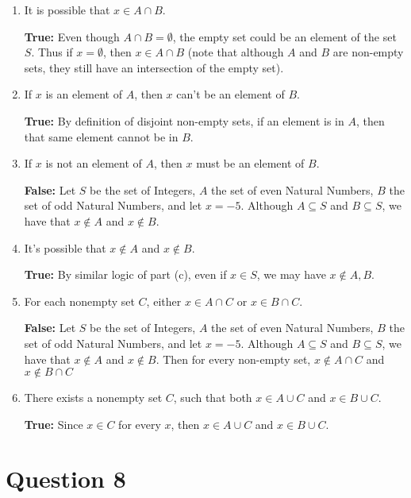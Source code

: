 \documentclass[11pt, oneside]{article}   	%
\begin{document}
\begin{enumerate}[ (a)]    

    \item It is possible that $x \in A \cap B$.
    
    \textbf{True:} Even though $A \cap B = \emptyset$, the empty set could be an element of the set $S$. Thus if $x = \emptyset$, then $x \in A \cap B$ (note that although $A$ and $B$ are non-empty sets, they still have an intersection of the empty set).
    
    \item If $x$ is an element of $A$, then $x$ can't be an element of $B$.
    
    \textbf{True:} By definition of disjoint non-empty sets, if an element is in $A$, then that same element cannot be in $B$.
    
    \item If $x$ is not an element of $A$, then $x$ must be an element of $B$.
    
    \textbf{False:} Let $S$ be the set of Integers, $A$ the set of even Natural Numbers, $B$ the set of odd Natural Numbers, and let $x = -5$. Although $A \subseteq S$ and $B \subseteq S$, we have that $x \notin A$ and $x \notin B$.
    
    \item It's possible that $x \notin A$ and $x \notin B$.
    
    \textbf{True:} By similar logic of part (c), even if $x \in S$, we may have $x \notin A, B$.
    
    \item For each nonempty set $C$, either $x \in A \cap C$ or $x \in B \cap C$.
    
    \textbf{False:} Let $S$ be the set of Integers, $A$ the set of even Natural Numbers, $B$ the set of odd Natural Numbers, and let $x = -5$. Although $A \subseteq S$ and $B \subseteq S$, we have that $x \notin A$ and $x \notin B$. Then for every non-empty set, $x \notin A \cap C$ and $x \notin B \cap C$
    
    \item There exists a nonempty set $C$, such that both $x \in A \cup C$ and $x \in B \cup C$. 
    
    \textbf{True:} Since $x \in C$ for every $x$, then $x \in A \cup C$ and $x \in B \cup C$.

\end{enumerate}


\section*{Question 8}
\end{document}
